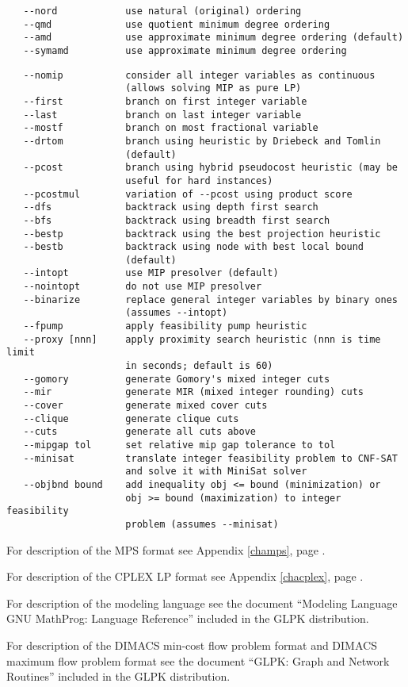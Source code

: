 
\begin{verbatim}
   --nord            use natural (original) ordering
   --qmd             use quotient minimum degree ordering
   --amd             use approximate minimum degree ordering (default)
   --symamd          use approximate minimum degree ordering
\end{verbatim}


\begin{verbatim}
   --nomip           consider all integer variables as continuous
                     (allows solving MIP as pure LP)
   --first           branch on first integer variable
   --last            branch on last integer variable
   --mostf           branch on most fractional variable
   --drtom           branch using heuristic by Driebeck and Tomlin
                     (default)
   --pcost           branch using hybrid pseudocost heuristic (may be
                     useful for hard instances)
   --pcostmul        variation of --pcost using product score
   --dfs             backtrack using depth first search
   --bfs             backtrack using breadth first search
   --bestp           backtrack using the best projection heuristic
   --bestb           backtrack using node with best local bound
                     (default)
   --intopt          use MIP presolver (default)
   --nointopt        do not use MIP presolver
   --binarize        replace general integer variables by binary ones
                     (assumes --intopt)
   --fpump           apply feasibility pump heuristic
   --proxy [nnn]     apply proximity search heuristic (nnn is time limit
                     in seconds; default is 60)
   --gomory          generate Gomory's mixed integer cuts
   --mir             generate MIR (mixed integer rounding) cuts
   --cover           generate mixed cover cuts
   --clique          generate clique cuts
   --cuts            generate all cuts above
   --mipgap tol      set relative mip gap tolerance to tol
   --minisat         translate integer feasibility problem to CNF-SAT
                     and solve it with MiniSat solver
   --objbnd bound    add inequality obj <= bound (minimization) or
                     obj >= bound (maximization) to integer feasibility
                     problem (assumes --minisat)
\end{verbatim}

For description of the MPS format see Appendix \ref{champs}, page
\pageref{champs}.

For description of the CPLEX LP format see Appendix \ref{chacplex},
page \pageref{chacplex}.

For description of the modeling language see the document ``Modeling
Language GNU MathProg: Language Reference'' included in the GLPK
distribution.

\newpage

For description of the DIMACS min-cost flow problem format and DIMACS
maximum flow problem format see the document ``GLPK: Graph and Network
Routines'' included in the GLPK distribution.

